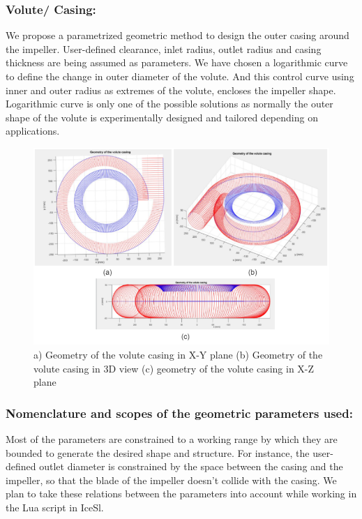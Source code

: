 \documentclass[11pt,a4paper]{scrartcl}
\begin{document}
\subsubsection{Volute/ Casing: }
We propose a parametrized geometric method to design the outer casing around the impeller. User-defined clearance, inlet radius, outlet radius and casing thickness are being assumed as parameters.  We have chosen a logarithmic curve to define the change in outer diameter of the volute. And this control curve using inner and outer radius as extremes of the volute, encloses the impeller shape. Logarithmic curve is only one of the possible solutions as normally the outer shape of the volute is experimentally designed and tailored depending on applications.  
\begin{figure}[h]
    \centering
    \includegraphics[scale=1]{image10.png}
    \caption{  a) Geometry of the volute casing in X-Y plane (b) Geometry of the volute casing in 3D view (c) geometry of the volute casing in X-Z plane
 }
    \label{fig:image4}
    
\end{figure}
\subsubsection{Nomenclature and scopes of the geometric parameters used:}
Most of the parameters are constrained to a working range by which they are bounded to generate the desired shape and structure. For instance, the user-defined outlet diameter is constrained by the space between the casing and the impeller, so that the blade of the impeller doesn't collide with the casing. We plan to take these relations between the parameters into account while working in the Lua script in IceSl. 
\end{document}
